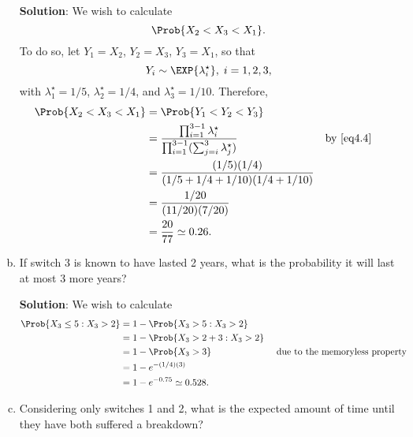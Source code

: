 \begin{Example}
\begin{enumerate}[(a)]
              \textbf{Solution}: We wish to calculate
              \[ \Prob{X_2<X_3<X_1}. \]
              To do so, let $ Y_1=X_2 $, $ Y_2=X_3 $, $ Y_3=X_1 $, so that
              \[ Y_i \sim \EXP{\lambda_i^\star},\; i=1,2,3, \]
              with $ \lambda_1^\star=1/5 $, $ \lambda_2^\star=1/4 $, and $ \lambda_3^\star=1/10 $. Therefore,
              \begin{align*}
                  \Prob{X_2<X_3<X_1}
                   & =\Prob{Y_1<Y_2<Y_3}                                                                                                   \\
                   & =\frac{\prod_{i=1}^{3-1}\lambda_i^\star}{\prod_{i=1}^{3-1}(\sum_{j=i}^{3}\lambda_j^\star)} &  & \text{by~\ref{eq4.4}} \\
                   & =\frac{(1/5)(1/4)}{(1/5+1/4+1/10)(1/4+1/10)}                                                                          \\
                   & =\frac{1/20}{(11/20)(7/20)}                                                                                           \\
                   & =\frac{20}{77}\simeq 0.26.
              \end{align*}
        \item If switch 3 is known to have lasted 2 years, what is the probability it will last at most 3
              more years?

              \textbf{Solution}: We wish to calculate
              \begin{align*}
                  \Prob{X_3\le 5\given X_3>2}
                   & =1-\Prob{X_3>5\given X_3>2}                                               \\
                   & =1-\Prob{X_3>2+3\given X_3>2}                                             \\
                   & =1-\Prob{X_3>3}               &  & \text{ due to the memoryless property} \\
                   & =1-e^{-(1/4)(3)}                                                          \\
                   & =1-e^{-0.75}\simeq 0.528.
              \end{align*}
        \item Considering only switches 1 and 2, what is the expected amount of time until they have
              both suffered a breakdown?


\end{enumerate}
\end{Example}

